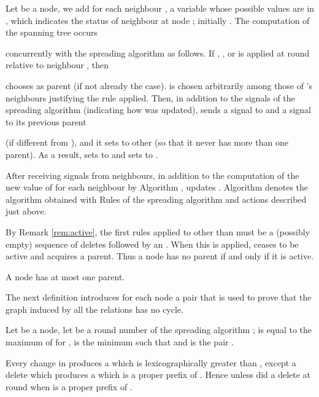 \documentclass[11pt,envcountsame,letterpaper]{llncs}
\begin{document}
Let  be a node, we add for each neighbour ,  a variable 
 whose possible values are in , which indicates the status of neighbour  at node ; initially 
.
The computation of the spanning tree occurs

concurrently with the spreading algorithm  as follows. If , , or  is applied at round  relative to neighbour , then 

chooses  as parent (if not already the case).
 is chosen arbitrarily among those of 's neighbours justifying the rule applied.
Then, in addition to the signals of the spreading algorithm (indicating how  was updated),  sends a signal  to  and a signal  to its previous parent

(if different from ), and it sets  to other (so that it never has more than one parent). As a result,  sets  to 
and  sets  to .

After  receiving signals from neighbours,
in addition to the computation of the new value of  for each neighbour
 by Algorithm 
,  updates .
Algorithm  
denotes the algorithm obtained with Rules of the spreading
algorithm  and actions described just above.


\begin{remark}\label{rem9}
By Remark \ref{rem:active}, the first rules applied to  other than  must be a
(possibly empty) sequence of deletes followed by an . When this  is applied,
 ceases to be active and acquires a parent. Thus a
node has no parent if and only if it  is active.
\end{remark}
\begin{remark}\label{15}
A node has at most one parent.
\end{remark}



The next definition introduces for each node  a
pair
 that is
used to prove that the graph induced by all the  relations has no cycle.
\begin{definition}
Let  be a node, let  be a round number of the spreading
algorithm ;  is equal to the maximum of  for ,
 is the minimum  such that  and  is the pair
.
\end{definition}
Every change in  produces a  which is lexicographically greater than , except a delete which produces a  which is a proper prefix of .
Hence  unless  did a delete at round  when  is a
proper prefix of .
\end{document}
